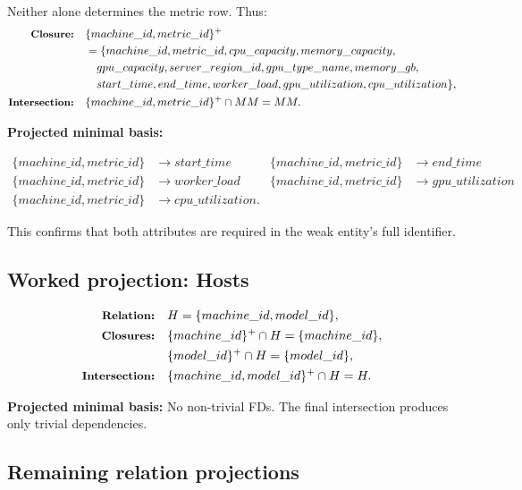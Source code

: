 \documentclass[11pt]{article}
\newcommand{\fd}{\rightarrow}
\newcommand{\projlabel}[1]{\text{\small\bfseries #1}}
\begin{document}
Neither alone determines the metric row. Thus:
\begin{align*}
\projlabel{Closure:} &\quad \{machine\_id, metric\_id\}^{+}\\
&\quad = \{machine\_id, metric\_id, cpu\_capacity, memory\_capacity,\\
&\qquad gpu\_capacity, server\_region\_id, gpu\_type\_name, memory\_gb,\\
&\qquad start\_time, end\_time, worker\_load, gpu\_utilization, cpu\_utilization\},\\
\projlabel{Intersection:} &\quad \{machine\_id, metric\_id\}^{+} \cap MM = MM.
\end{align*}

\begin{center}
    \textbf{Projected minimal basis:}
\end{center}
\begin{align*}
\{machine\_id, metric\_id\} &\fd start\_time &
\{machine\_id, metric\_id\} &\fd end\_time\\
\{machine\_id, metric\_id\} &\fd worker\_load &
\{machine\_id, metric\_id\} &\fd gpu\_utilization\\
\{machine\_id, metric\_id\} &\fd cpu\_utilization.&&
\end{align*}

This confirms that both attributes are required in the weak entity's full identifier.

\subsection{Worked projection: Hosts}

\begin{align*}
\projlabel{Relation:} &\quad H = \{machine\_id, model\_id\},\\
\projlabel{Closures:} &\quad \{machine\_id\}^{+} \cap H = \{machine\_id\},\\
&\quad \{model\_id\}^{+} \cap H = \{model\_id\},\\
\projlabel{Intersection:} &\quad \{machine\_id, model\_id\}^{+} \cap H = H.
\end{align*}

\noindent\textbf{Projected minimal basis:} No non-trivial FDs. The final intersection
produces only trivial dependencies.

\subsection{Remaining relation projections}
\end{document}
